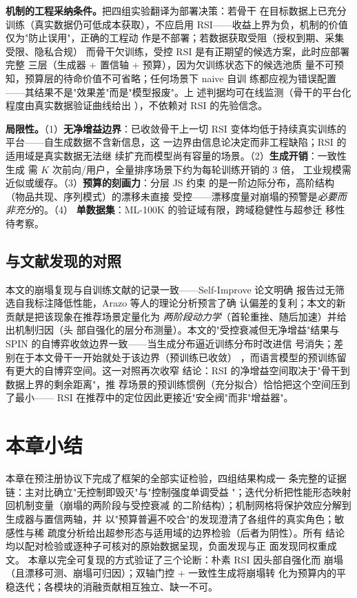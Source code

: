 \textbf{机制的工程采纳条件。}把四组实验翻译为部署决策：若骨干
在目标数据上已充分训练（真实数据仍可低成本获取），不应启用
RSI——收益上界为负，机制的价值仅为"防止误用"，正确的工程动
作是不部署；若数据获取受阻（授权到期、采集受限、隐私合规）
而骨干欠训练，受控 RSI 是有正期望的候选方案，此时应部署完整
三层（生成器 + 置信轴 + 预算），因为欠训练状态下的候选池质
量不可预知，预算层的待命价值不可省略；任何场景下 naive 自训
练都应视为错误配置——其结果不是"效果差"而是"模型报废"。上
述判据均可在线监测（骨干的平台化程度由真实数据验证曲线给出
），不依赖对 RSI 的先验信念。

\textbf{局限性。}（1）\textbf{无净增益边界}：已收敛骨干上一切
RSI 变体均低于持续真实训练的平台——自生成数据不含新信息，这
一边界由信息论决定而非工程缺陷；RSI 的适用域是真实数据无法继
续扩充而模型尚有容量的场景。（2）\textbf{生成开销}：一致性生成
需 $K$ 次前向/用户，全量排序场景下约为每轮训练开销的 3 倍，
工业规模需近似或缓存。（3）\textbf{预算的刻画力}：分层 JS 约束
的是一阶边际分布，高阶结构（物品共现、序列模式）的漂移未直接
受控——漂移度量对崩塌的预警是\emph{必要而非充分}的。（4）
\textbf{单数据集}：ML-100K 的验证域有限，跨域稳健性与超参迁
移性待考察。

\subsection{与文献发现的对照}
本文的崩塌复现与自训练文献的记录一致——Self-Improve 论文明确
报告过无筛选自我标注降低性能，Arazo 等人的理论分析预言了确
认偏差的复利；本文的新贡献是把该现象在推荐场景定量化为
\emph{两阶段动力学}（首轮重挫、随后加速）并给出机制归因（头
部自强化的层分布测量）。本文的"受控衰减但无净增益"结果与
SPIN 的自博弈收敛边界一致——当生成分布逼近训练分布时改进信
号消失；差别在于本文骨干一开始就处于该边界（预训练已收敛）
，而语言模型的预训练留有更大的自博弈空间。这一对照再次收窄
结论：RSI 的净增益空间取决于"骨干到数据上界的剩余距离"，推
荐场景的预训练惯例（充分拟合）恰恰把这个空间压到了最小——
RSI 在推荐中的定位因此更接近"安全阀"而非"增益器"。

\section{本章小结}
本章在预注册协议下完成了框架的全部实证检验，四组结果构成一
条完整的证据链：主对比确立"无控制即毁灭"与"控制强度单调受益
"；迭代分析把性能形态映射回机制变量（崩塌的两阶段与受控衰减
的二阶结构）；机制网格将保护效应分解到生成器与置信两轴，并
以"预算普遍不咬合"的发现澄清了各组件的真实角色；敏感性与稀
疏度分析给出超参形态与适用域的边界检验（后者为阴性）。所有
结论均以配对检验或逐种子可核对的原始数据呈现，负面发现与正
面发现同权重成文。
本章以完全可复现的方式验证了三个论断：朴素 RSI 因头部自强化而
崩塌（且漂移可测、崩塌可归因）；双轴门控 + 一致性生成将崩塌转
化为预算内的平稳迭代；各模块的消融贡献相互独立、缺一不可。
